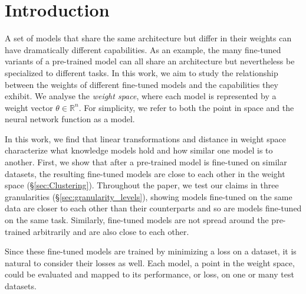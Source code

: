 \documentclass[nohyperref]{article}
\theoremstyle{plain}
\theoremstyle{definition}
\theoremstyle{remark}
\begin{document}
\section{Introduction}
A set of models that share the same architecture but differ in their weights can have dramatically different capabilities.
As an example, the many fine-tuned variants of a pre-trained model can all share an architecture but nevertheless be specialized to different tasks.
In this work, we aim to study the relationship between the weights of different fine-tuned models and the capabilities they exhibit. We analyse the \emph{weight space}, where each model is represented by a weight vector $\theta \in \mathbb{R}^n$. For simplicity, we refer to both the point in space and the neural network function as a model.


In this work, we find that linear transformations and distance in weight space characterize what knowledge models hold and how similar one model is to another.
First, we show that after a pre-trained model is fine-tuned on similar datasets, the resulting fine-tuned models are close to each other in the weight space (\S\ref{sec:Clustering}). Throughout the paper, we test our claims in three granularities (\S\ref{sec:granularity_levels}), showing models fine-tuned on the same data are closer to each other than their counterparts and so are models fine-tuned on the same task. Similarly, fine-tuned models are not spread around the pre-trained arbitrarily and are also close to each other.

Since these fine-tuned models are trained by minimizing a loss on a dataset, it is natural to consider their losses as well. Each model, a point in the weight space, could be evaluated and mapped to its performance, or loss, on one or many test datasets.
\end{document}
